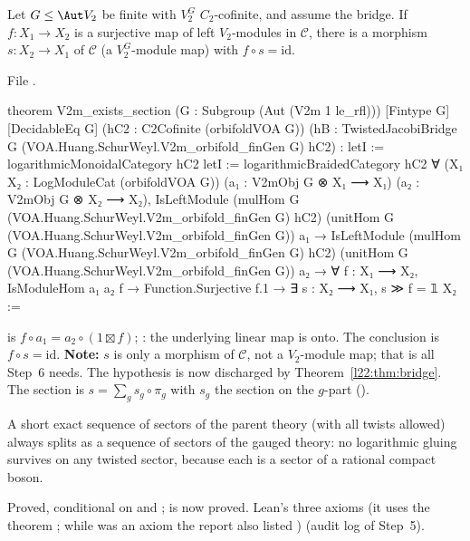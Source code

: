 \begin{theorem}\label{l22:thm:O5}
Let $G\le\Aut V_2$ be finite with $V_2^G$ $C_2$-cofinite, and assume the bridge. If $f:X_1\to X_2$ is a surjective map of
left $V_2$-modules in $\mathcal C$, there is a morphism $s:X_2\to X_1$ of $\mathcal C$ (a $V_2^G$-module map) with
$f\circ s=\mathrm{id}$.
\end{theorem}
\noindent File .
\begin{leancode}
theorem V2m_exists_section (G : Subgroup (Aut (V2m 1 le_rfl))) [Fintype G] [DecidableEq G]
    (hC2 : C2Cofinite (orbifoldVOA G))
    (hB : TwistedJacobiBridge G (VOA.Huang.SchurWeyl.V2m_orbifold_finGen G) hC2) :
    letI := logarithmicMonoidalCategory hC2
    letI := logarithmicBraidedCategory hC2
    ∀ (X₁ X₂ : LogModuleCat (orbifoldVOA G)) (a₁ : V2mObj G ⊗ X₁ ⟶ X₁)
      (a₂ : V2mObj G ⊗ X₂ ⟶ X₂),
      IsLeftModule (mulHom G (VOA.Huang.SchurWeyl.V2m_orbifold_finGen G) hC2)
        (unitHom G (VOA.Huang.SchurWeyl.V2m_orbifold_finGen G)) a₁ →
      IsLeftModule (mulHom G (VOA.Huang.SchurWeyl.V2m_orbifold_finGen G) hC2)
        (unitHom G (VOA.Huang.SchurWeyl.V2m_orbifold_finGen G)) a₂ →
      ∀ f : X₁ ⟶ X₂, IsModuleHom a₁ a₂ f → Function.Surjective f.1 →
        ∃ s : X₂ ⟶ X₁, s ≫ f = 𝟙 X₂ :=
\end{leancode}

\begin{dictionary}
 is $f\circ a_1=a_2\circ(1\boxtimes f)$; : the underlying linear
map is onto. The conclusion  is $f\circ s=\mathrm{id}$. \textbf{Note:} $s$ is only a morphism of
$\mathcal C$, not a $V_2$-module map; that is all Step~6 needs. The hypothesis  is now discharged by
Theorem~\ref{l22:thm:bridge}. The section is $s=\sum_gs_g\circ\pi_g$ with $s_g$ the section on the $g$-part
().
\end{dictionary}

\begin{physics}
A short exact sequence of sectors of the parent theory (with all twists allowed) always splits as a sequence of sectors
of the gauged theory: no logarithmic gluing survives on any twisted sector, because each is a sector of a rational
compact boson.
\end{physics}

\begin{status}
Proved, conditional on  and ;  is now proved. Lean's three axioms (it uses the theorem ; while  was an axiom the report also listed ) (audit
log of Step~5).
\end{status}

